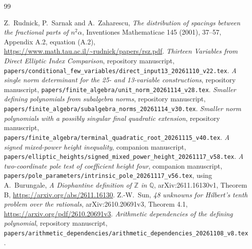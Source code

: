 \documentclass[11pt,a4paper]{article}
\newcommand{\Q}{\mathbb Q}\newcommand{\Z}{\mathbb Z}
\begin{document}
\begin{thebibliography}{99}\raggedright
{}Z.~Rudnick, P.~Sarnak and A.~Zaharescu,
\emph{The distribution of spacings between the fractional parts of
$n^2\alpha$}, Inventiones Mathematicae 145 (2001), 37--57,
Appendix A.2, equation (A.2),
\url{https://www.math.tau.ac.il/~rudnick/papers/rsz.pdf}.
\emph{Thirteen Variables from Direct Elliptic
Index Comparison}, repository manuscript,
\nolinkurl{papers/conditional_few_variables/direct_input13_20261110_v22.tex}.
\emph{A single norm determinant for the 25- and 13-variable
constructions}, repository manuscript,
\nolinkurl{papers/finite_algebra/unit_norm_20261114_v28.tex}.
\emph{Smaller defining polynomials from subalgebra norms},
repository manuscript,
\nolinkurl{papers/finite_algebra/subalgebra_norms_20261114_v30.tex}.
\emph{Smaller norm polynomials with a possibly singular
final quadratic extension}, repository manuscript,
\nolinkurl{papers/finite_algebra/terminal_quadratic_root_20261115_v40.tex}.
\emph{A signed mixed-power height inequality},
companion manuscript,
\nolinkurl{papers/elliptic_heights/signed_mixed_power_height_20261117_v58.tex}.
\emph{A two-coordinate pole test of coefficient
height four}, companion manuscript,
\nolinkurl{papers/pole_parameters/intrinsic_pole_20261117_v56.tex},
using A.~Burungale,
\emph{A Diophantine definition of $\Z$ in $\Q$},
arXiv:2611.16130v1, Theorem B,
\url{https://arxiv.org/abs/2611.16130}.
Z.-W.~Sun,
\emph{48 unknowns for Hilbert's tenth problem over the rationals},
arXiv:2610.20691v3, Theorem 4.1,
\url{https://arxiv.org/pdf/2610.20691v3}.
\emph{Arithmetic dependencies of the defining
polynomial}, repository manuscript,
\nolinkurl{papers/arithmetic_dependencies/arithmetic_dependencies_20261108_v8.tex}.
\end{thebibliography}
\end{document}
